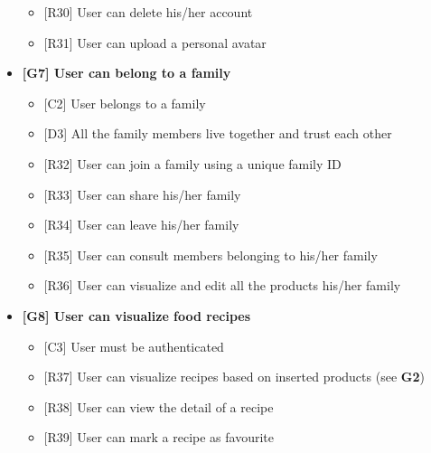 \begin{itemize}
\begin{itemize}
        \item {[R30] User can delete his/her account}
        \item {[R31] User can upload a personal avatar}
    \end{itemize}
    \item \textbf{[G7] User can belong to a family}
    \begin{itemize}
        \item {[C2] User belongs to a family}
        \item {[D3] All the family members live together and trust each other}
        \item {[R32] User can join a family using a unique family ID}
        \item {[R33] User can share his/her family}
        \item {[R34] User can leave his/her family}
        \item {[R35] User can consult members belonging to his/her family}
        \item {[R36] User can visualize and edit all the products his/her family}
    \end{itemize}
    \item \textbf{[G8] User can visualize food recipes}
    \begin{itemize}
        \item {[C3] User must be authenticated}
        \item {[R37] User can visualize recipes based on inserted products (see \textbf{G2})}
        \item {[R38] User can view the detail of a recipe}
        \item {[R39] User can mark a recipe as favourite}
    \end{itemize}
\end{itemize}

\def\fillandplacepagenumber{%
 \par\pagestyle{empty}%
\vbox to 0pt{\vss}\vfill
\vbox to 0pt{\baselineskip0pt
   \hbox to\linewidth{\hss}%
   \setlength{\footskip}{70pt}
   \baselineskip\footskip
   \hbox to\linewidth{%
     \hfil\thepage\hfil}\vss}}





